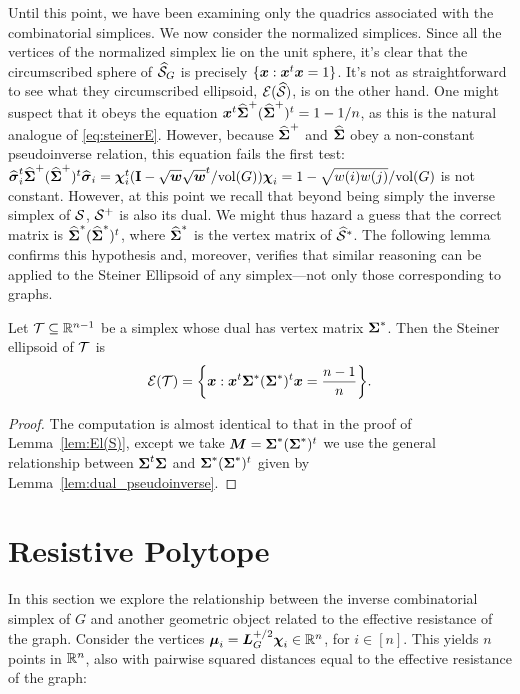 Until this point, we have been examining only the quadrics associated with the combinatorial simplices. We now consider the normalized simplices. Since all the vertices of the normalized simplex lie on the unit sphere, it's clear  that the circumscribed sphere of $\widehat{\mathcal{S}}_G$ is precisely $\{\vb*{x}:\vb*{x}^t\vb*{x}=1\}$. It's not as straightforward  to see what they circumscribed ellipsoid, $\mathcal{E}(\widehat{\mathcal{S}})$, is on the other hand. One might suspect that it obeys the  equation $\vb*{x}^t \widehat{\boldsymbol{\Sigma}}^+(\widehat{\boldsymbol{\Sigma}}^+)^t=1-1/n$, as this is the natural analogue of \eqref{eq:steinerE}. However, because $\widehat{\boldsymbol{\Sigma}}^+$ and $\widehat{\boldsymbol{\Sigma}}$ obey a non-constant pseudoinverse relation, this equation fails the first test: $\widehat{\vb*{\sigma}}_i^t\widehat{\boldsymbol{\Sigma}}^+(\widehat{\boldsymbol{\Sigma}}^+)^t\widehat{\vb*{\sigma}}_i = \boldsymbol{\chi}_i^t(\vb{I}-\sqrt{\vb*{w}}\sqrt{\vb*{w}}^t/\textnormal{vol}(G))\boldsymbol{\chi}_i=1-\sqrt{w(i)w(j)}/\textnormal{vol}(G)$ is not constant. 
However, at this point we recall that beyond being simply  the inverse simplex of $\mathcal{S}$, $\mathcal{S}^+$ is also its dual.  We might thus hazard a guess that the correct matrix is $\widehat{\boldsymbol{\Sigma}}^* (\widehat{\boldsymbol{\Sigma}}^*)^t$, where $\widehat{\boldsymbol{\Sigma}}^*$ is the vertex matrix of $\widehat{\mathcal{S}}^*$. The  following lemma  confirms this hypothesis and, moreover, verifies that similar reasoning can be applied to the Steiner Ellipsoid of any simplex---not only those corresponding to graphs.  

\begin{lemma}
	\label{lem:El(T)_general}
	Let $\mathcal{T}\subseteq\mathbb{R}^{n-1}$ be a simplex whose dual has vertex matrix  $\boldsymbol{\Sigma}^*$. Then  the Steiner ellipsoid of $\mathcal{T}$ is 
	\begin{equation*}
	\mathcal{E}(\mathcal{T}) = \bigg\{\vb*{x}:\vb*{x}^t\boldsymbol{\Sigma}^*(\boldsymbol{\Sigma}^*)^t\vb*{x}=\frac{n-1}{n}\bigg\}.
	\end{equation*} 
\end{lemma}

\begin{proof}
	The computation is almost identical to that in the proof of Lemma~\ref{lem:El(S)}, except we  take ${\vb*{M}}=\boldsymbol{\Sigma}^*(\boldsymbol{\Sigma}^*)^t$  we use the general relationship between  $\boldsymbol{\Sigma}^t\boldsymbol{\Sigma}$ and $\boldsymbol{\Sigma}^*(\boldsymbol{\Sigma}^*)^t$ given by Lemma~\ref{lem:dual_pseudoinverse}. 
\end{proof}


\section{Resistive Polytope}
\label{sec:resistive_polytope}
In this section we explore the relationship between the inverse combinatorial simplex of $G$ and another geometric object related to the effective resistance of the graph. Consider the vertices $\vb*{\mu}_i=\vb*{L}_G^{+/2}\boldsymbol{\chi}_i\in\mathbb{R}^n$, for $i\in[n]$. This yields $n$ points in $\mathbb{R}^n$, also with pairwise squared distances equal to the effective resistance of the graph: 

